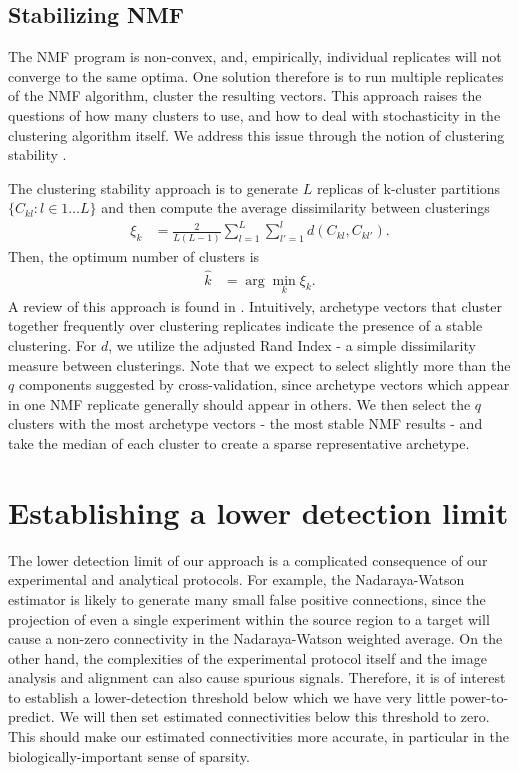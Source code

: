 \documentclass{article}
\begin{document}
\subsection{Stabilizing NMF}

The NMF program is non-convex, and, empirically, individual replicates will not converge to the same optima.
One solution therefore is to run multiple replicates of the NMF algorithm, cluster the resulting vectors.
This approach raises the questions of how many clusters to use, and how to deal with stochasticity in the clustering algorithm itself.
We address this issue through the notion of clustering stability \citep{Von_Luxburg2010-lu}.

The clustering stability approach is to generate $L$ replicas of k-cluster partitions $\{C_{kl} : l \in 1 \dots L\}$ and then compute the average dissimilarity between clusterings
\begin{align*}
\xi_k &= \frac{2}{L(L - 1)} \sum_{l = 1}^{L} \sum_{l'= 1}^{l}  d(C_{kl}, C_{kl'}).
\end{align*}
Then, the optimum number of clusters is 
\begin{align*}
\hat k &= \arg \min_k \xi_k.
\end{align*}
A review of this approach is found in \citet{Von_Luxburg2010-qe}.
Intuitively, archetype vectors that cluster together frequently over clustering replicates indicate the presence of a stable clustering.
For $d$, we utilize the adjusted Rand Index - a simple dissimilarity measure between clusterings.
Note that we expect to select slightly more than the $q$ components suggested by cross-validation, since archetype vectors which appear in one NMF replicate generally should appear in others.
We then select the $q$ clusters with the most archetype vectors - the most stable NMF results - and take the median of each cluster to create a sparse representative archetype.


\section{Establishing a lower detection limit}

The lower detection limit of our approach is a complicated consequence of our experimental and analytical protocols.
For example, the Nadaraya-Watson estimator is likely to generate many small false positive connections, since the projection of even a single experiment within the source region to a target will cause a non-zero connectivity in the Nadaraya-Watson weighted average.
On the other hand, the complexities of the experimental protocol itself and the image analysis and alignment can also cause spurious signals.
Therefore, it is of interest to establish a lower-detection threshold below which we have very little power-to-predict.
We will then set estimated connectivities below this threshold to zero.
This should make our estimated connectivities more accurate, in particular in the biologically-important sense of sparsity.
\end{document}
